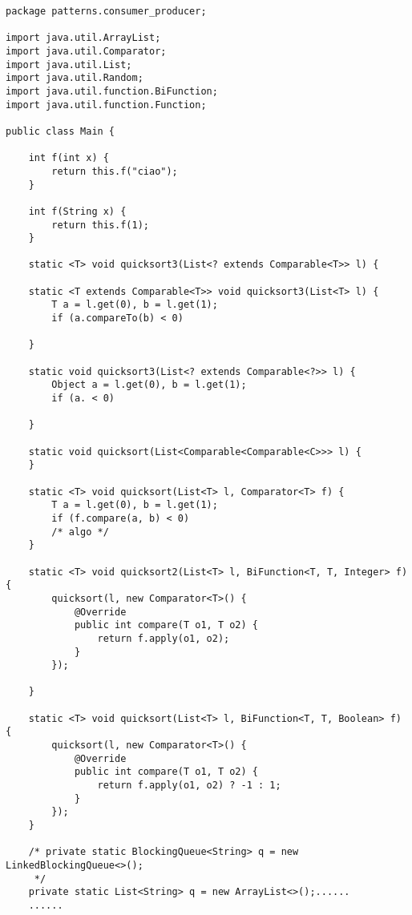 \begin{lstlisting}
package patterns.consumer_producer;

import java.util.ArrayList;
import java.util.Comparator;
import java.util.List;
import java.util.Random;
import java.util.function.BiFunction;
import java.util.function.Function;

public class Main {

    int f(int x) {
        return this.f("ciao");
    }

    int f(String x) {
        return this.f(1);
    }

    static <T> void quicksort3(List<? extends Comparable<T>> l) {

    static <T extends Comparable<T>> void quicksort3(List<T> l) {
        T a = l.get(0), b = l.get(1);
        if (a.compareTo(b) < 0)

    }

    static void quicksort3(List<? extends Comparable<?>> l) {
        Object a = l.get(0), b = l.get(1);
        if (a. < 0)

    }

    static void quicksort(List<Comparable<Comparable<C>>> l) {
    }

    static <T> void quicksort(List<T> l, Comparator<T> f) {
        T a = l.get(0), b = l.get(1);
        if (f.compare(a, b) < 0)
        /* algo */
    }

    static <T> void quicksort2(List<T> l, BiFunction<T, T, Integer> f) {
        quicksort(l, new Comparator<T>() {
            @Override
            public int compare(T o1, T o2) {
                return f.apply(o1, o2);
            }
        });

    }

    static <T> void quicksort(List<T> l, BiFunction<T, T, Boolean> f) {
        quicksort(l, new Comparator<T>() {
            @Override
            public int compare(T o1, T o2) {
                return f.apply(o1, o2) ? -1 : 1;
            }
        });
    }

    /* private static BlockingQueue<String> q = new LinkedBlockingQueue<>();
     */
    private static List<String> q = new ArrayList<>();......
    ......    
\end{lstlisting}
